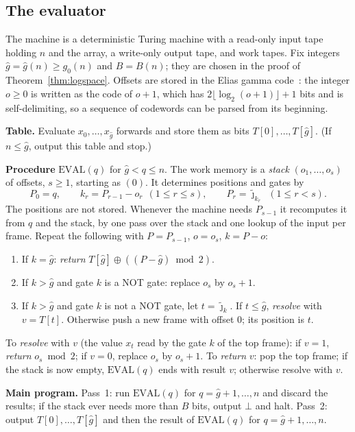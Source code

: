 \documentclass[11pt]{amsart}
\theoremstyle{definition}
\theoremstyle{remark}
\newcommand{\jt}{\tilde{\jmath}}
\newcommand{\ghat}{\hat g}
\begin{document}
\subsection{The evaluator}

The machine is a deterministic Turing machine with a read-only input tape holding $n$ and the
array, a write-only output tape, and work tapes. Fix integers $\ghat=\ghat(n)\ge g_0(n)$ and
$B=B(n)$; they are chosen in the proof of Theorem~\ref{thm:logspace}. Offsets are stored in the
Elias gamma code~\cite{elias}: the integer $o\ge0$ is written as the code of $o+1$, which has
$2\lfloor\log_2(o+1)\rfloor+1$ bits and is self-delimiting, so a sequence of codewords can be
parsed from its beginning.

\medskip\noindent\textbf{Table.} Evaluate $x_0,\dots,x_{\ghat}$ forwards and store them as bits
$T[0],\dots,T[\ghat]$. (If $n\le\ghat$, output this table and stop.)

\medskip\noindent\textbf{Procedure} $\mathrm{EVAL}(q)$ for $\ghat<q\le n$. The work memory is a
\emph{stack} $(o_1,\dots,o_s)$ of offsets, $s\ge1$, starting as $(0)$. It determines positions and
gates by
\[
P_0=q,\qquad k_r=P_{r-1}-o_r\ \ (1\le r\le s),\qquad P_r=\jt_{k_r}\ \ (1\le r<s).
\]
The positions are not stored. Whenever the machine needs $P_{s-1}$ it recomputes it from $q$ and
the stack, by one pass over the stack and one lookup of the input per frame. Repeat the following
with $P=P_{s-1}$, $o=o_s$, $k=P-o$:
\begin{enumerate}[label=(\alph*),leftmargin=2.4em]
\item If $k=\ghat$: \emph{return} $T[\ghat]\oplus((P-\ghat)\bmod2)$.
\item If $k>\ghat$ and gate $k$ is a NOT gate: replace $o_s$ by $o_s+1$.
\item If $k>\ghat$ and gate $k$ is not a NOT gate, let $t=\jt_k$. If $t\le\ghat$, \emph{resolve}
with $v=T[t]$. Otherwise push a new frame with offset $0$; its position is $t$.
\end{enumerate}
To \emph{resolve} with $v$ (the value $x_t$ read by the gate $k$ of the top frame): if $v=1$,
\emph{return} $o_s\bmod2$; if $v=0$, replace $o_s$ by $o_s+1$. To \emph{return} $v$: pop the top
frame; if the stack is now empty, $\mathrm{EVAL}(q)$ ends with result $v$; otherwise resolve with
$v$.

\medskip\noindent\textbf{Main program.} Pass~1: run $\mathrm{EVAL}(q)$ for $q=\ghat+1,\dots,n$ and
discard the results; if the stack ever needs more than $B$ bits, output $\bot$ and halt. Pass~2:
output $T[0],\dots,T[\ghat]$ and then the result of $\mathrm{EVAL}(q)$ for $q=\ghat+1,\dots,n$.
\end{document}
